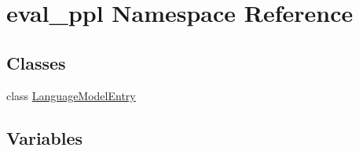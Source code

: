 \hypertarget{namespaceeval__ppl}{}\section{eval\+\_\+ppl Namespace Reference}
\label{namespaceeval__ppl}
\subsection*{Classes}
\begin{DoxyCompactItemize}
\item 
class \hyperlink{classeval__ppl_1_1LanguageModelEntry}{Language\+Model\+Entry}
\end{DoxyCompactItemize}
\subsection*{Variables}
